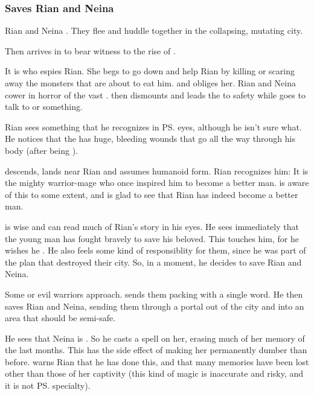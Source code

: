 \subsubsection{Saves Rian and Neina}
Rian and Neina . They flee and huddle together in the collapsing, mutating city. 

Then \Ishnaruchaefir{} arrives in \Malcur to bear witness to the rise of \Nithdornazsh. 

It is \Criseis who espies Rian.
She begs \Ishnaruchaefir to go down and help Rian by killing or scaring away the monsters that are about to eat him.
\Ishnaruchaefir {} and obliges her.
Rian and Neina cower in horror of the vast \dragon.
\Criseis then dismounts and leads the \humans to safety while \Ishnaruchaefir goes to talk to \Nzessuacrith or something.

Rian sees something that he recognizes in \ps{\Ishnaruchaefir} eyes, although he isn't sure what. 
He notices that the \dragon{} has huge, bleeding wounds that go all the way through his body (after being ). 

\Ishnaruchaefir{} descends, lands near Rian and assumes humanoid form. Rian recognizes him: It is the mighty warrior-mage who {once inspired him to become a better man}. 
\Ishnaruchaefir is aware of this to some extent, and is glad to see that Rian has indeed become a better man. 

\Ishnaruchaefir{} is wise and can read much of Rian's story in his eyes. He sees immediately that the young man has fought bravely to save his beloved. This touches him, for he wishes he . He also feels some kind of responsiblity for them, since he was part of the plan that destroyed their city. 
So, in a  moment, he decides to save Rian and Neina. 

Some \daemons{} or evil warriors approach. \Ishnaruchaefir{} sends them packing with a single word. He then saves Rian and Neina, sending them through a portal out of the city and into an area that should be semi-safe. 

He sees that Neina is . So he casts a spell on her, erasing much of her memory of the last months. This has the side effect of making her permanently dumber than before. \Ishnaruchaefir{} warns Rian that he has done this, and that many memories have been lost other than those of her captivity (this kind of magic is inaccurate and risky, and it is not \ps{\Ishnaruchaefir} specialty). 

